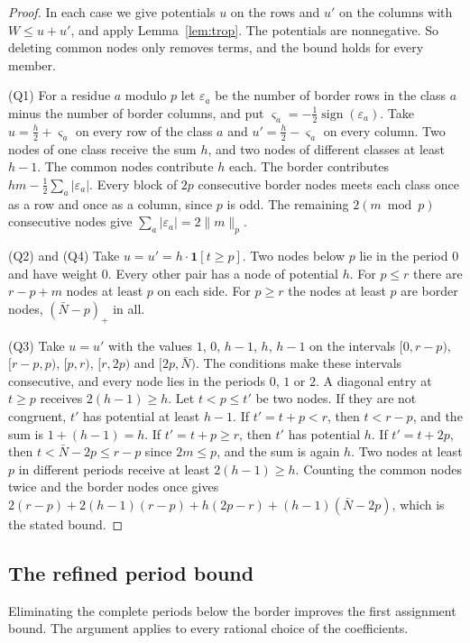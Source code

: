 \documentclass[11pt]{amsart}
\theoremstyle{definition}
\theoremstyle{remark}
\numberwithin{equation}{section}
\begin{document}
\begin{proof}
In each case we give potentials $u$ on the rows and $u'$ on the columns with $W\le u+u'$, and apply
Lemma~\ref{lem:trop}. The potentials are nonnegative. So deleting common nodes only removes terms, and the bound
holds for every member.

(Q1) For a residue $a$ modulo $p$ let $\varepsilon_a$ be the number of border rows in the class $a$ minus the number of
border columns, and put $\varsigma_a=-\frac12\operatorname{sign}(\varepsilon_a)$. Take $u=\frac h2+\varsigma_a$ on every
row of the class $a$ and $u'=\frac h2-\varsigma_a$ on every column. Two nodes of one class receive the sum $h$, and two
nodes of different classes at least $h-1$. The common nodes contribute $h$ each. The border contributes
$hm-\frac12\sum_a|\varepsilon_a|$. Every block of $2p$ consecutive border nodes meets each class once as a row and once
as a column, since $p$ is odd. The remaining $2(m\bmod p)$ consecutive nodes give $\sum_a|\varepsilon_a|=2\|m\|_p$.

(Q2) and (Q4) Take $u=u'=h\cdot\mathbf 1[t\ge p]$. Two nodes below $p$ lie in the period $0$ and have weight $0$. Every
other pair has a node of potential $h$. For $p\le r$ there are $r-p+m$ nodes at least $p$ on each side. For $p\ge r$
the nodes at least $p$ are border nodes, $(\bar N-p)_+$ in all.

(Q3) Take $u=u'$ with the values $1$, $0$, $h-1$, $h$, $h-1$ on the intervals $[0,r-p)$, $[r-p,p)$, $[p,r)$, $[r,2p)$ and
$[2p,\bar N)$. The conditions make these intervals consecutive, and every node lies in the periods $0$, $1$ or $2$. A
diagonal entry at $t\ge p$ receives $2(h-1)\ge h$. Let $t<p\le t'$ be two nodes. If they are not congruent, $t'$ has
potential at least $h-1$. If $t'=t+p<r$, then $t<r-p$, and the sum is $1+(h-1)=h$. If $t'=t+p\ge r$, then $t'$ has
potential $h$. If $t'=t+2p$, then $t<\bar N-2p\le r-p$ since $2m\le p$, and the sum is again $h$. Two nodes at least $p$
in different periods receive at least $2(h-1)\ge h$. Counting the common nodes twice and the border nodes once gives
$2(r-p)+2(h-1)(r-p)+h(2p-r)+(h-1)(\bar N-2p)$, which is the stated bound.
\end{proof}

\subsection{The refined period bound}
Eliminating the complete periods below the border improves the first assignment bound.
The argument applies to every rational choice of the coefficients.
\end{document}
